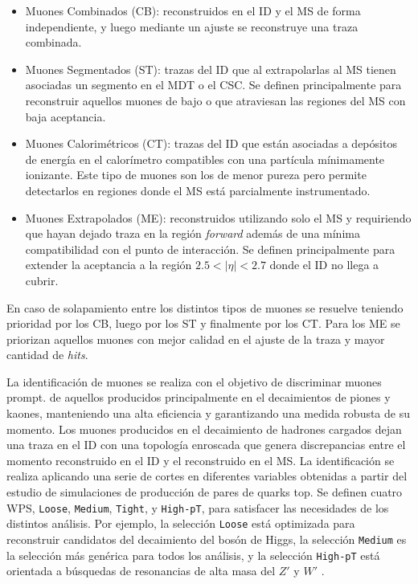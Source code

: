 \begin{itemize}

	\item Muones Combinados (CB): reconstruidos en el ID y el MS de forma independiente, y luego mediante un ajuste se reconstruye una traza combinada.

	\item Muones Segmentados (ST): trazas del ID que al extrapolarlas al MS tienen asociadas un segmento en el MDT o el CSC. Se definen principalmente para reconstruir aquellos muones de bajo \pt o que atraviesan las regiones del MS con baja aceptancia.

	\item Muones Calorimétricos (CT): trazas del ID que están asociadas a depósitos de energía en el calorímetro compatibles con una partícula mínimamente ionizante. Este tipo de muones son los de menor pureza pero permite detectarlos en regiones donde el MS está parcialmente instrumentado. 

	\item Muones Extrapolados (ME): reconstruidos utilizando solo el MS y requiriendo que hayan dejado traza en la región \textit{forward} además de una mínima compatibilidad con el punto de interacción. Se definen principalmente para extender la aceptancia a la región $2.5<|\eta|<2.7$ donde el ID no llega a cubrir.

\end{itemize}

En caso de solapamiento entre los distintos tipos de muones se resuelve teniendo prioridad por los CB, luego por los ST y finalmente por los CT. Para los ME se priorizan aquellos muones con mejor calidad en el ajuste de la traza y mayor cantidad de \textit{hits}.

La identificación de muones se realiza con el objetivo de discriminar muones prompt. de aquellos producidos principalmente en el decaimientos de piones y kaones, manteniendo una alta eficiencia y garantizando una medida robusta de su momento. Los muones producidos en el decaimiento de hadrones cargados dejan una traza en el ID con una topología enroscada 
que genera discrepancias entre el momento reconstruido en el ID y el reconstruido en el MS. La identificación se realiza aplicando una serie de cortes en diferentes variables \cite{PERF-2015-10} obtenidas a partir del estudio de simulaciones de producción de pares de quarks top. Se definen cuatro WPS, \texttt{Loose}, \texttt{Medium}, \texttt{Tight}, y \texttt{High-pT}, para satisfacer las necesidades de los distintos análisis. Por ejemplo, la selección \texttt{Loose} está optimizada para reconstruir candidatos del decaimiento del bosón de Higgs, la selección \texttt{Medium} es la selección más genérica para todos los análisis, y la selección \texttt{High-pT} está orientada a búsquedas de resonancias de alta masa del $Z'$ y $W'$ \cite{EXOT-2016-18,EXOT-2016-06,EXOT-2016-05,EXOT-2015-04}. 

